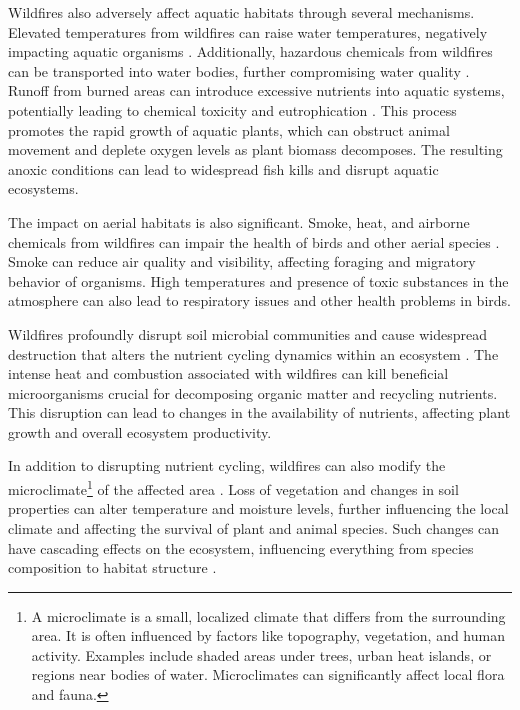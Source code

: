 \documentclass[
  12 pt,
]{Nemilov}
\begin{document}
Wildfires also adversely affect aquatic habitats through several mechanisms. Elevated temperatures from wildfires can raise water temperatures, negatively impacting aquatic organisms \citep{Schindler2017WarmerCS}. Additionally, hazardous chemicals from wildfires can be transported into water bodies, further compromising water quality \citep{Scordo2021SmokeFR}. Runoff from burned areas can introduce excessive nutrients into aquatic systems, potentially leading to chemical toxicity and eutrophication \citep{Vashukevich2023TaigaFO}. This process promotes the rapid growth of aquatic plants, which can obstruct animal movement and deplete oxygen levels as plant biomass decomposes. The resulting anoxic conditions can lead to widespread fish kills and disrupt aquatic ecosystems.

The impact on aerial habitats is also significant. Smoke, heat, and airborne chemicals from wildfires can impair the health of birds and other aerial species \citep{StuartSmith2002SongbirdCI}. Smoke can reduce air quality and visibility, affecting foraging and migratory behavior of organisms. High temperatures and presence of toxic substances in the atmosphere can also lead to respiratory issues and other health problems in birds.

Wildfires profoundly disrupt soil microbial communities and cause widespread destruction that alters the nutrient cycling dynamics within an ecosystem \citep{Eckdahl2023ClimateAF, Elliott2013InteractingEO}. The intense heat and combustion associated with wildfires can kill beneficial microorganisms crucial for decomposing organic matter and recycling nutrients. This disruption can lead to changes in the availability of nutrients, affecting plant growth and overall ecosystem productivity.

In addition to disrupting nutrient cycling, wildfires can also modify the microclimate\footnote{A microclimate is a small, localized climate that differs from the surrounding area. It is often influenced by factors like topography, vegetation, and human activity. Examples include shaded areas under trees, urban heat islands, or regions near bodies of water. Microclimates can significantly affect local flora and fauna.} of the affected area \citep{Brown2014WildfireAP, Wolf2021WildfireIO}. Loss of vegetation and changes in soil properties can alter temperature and moisture levels, further influencing the local climate and affecting the survival of plant and animal species. Such changes can have cascading effects on the ecosystem, influencing everything from species composition to habitat structure \citep{awadhiya2021principles}.
\end{document}

